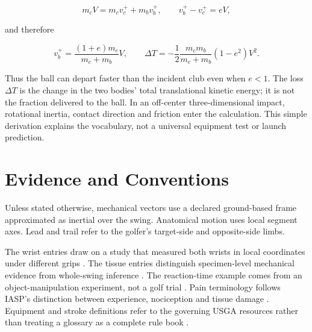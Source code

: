 \[
m_c V=m_c v_c^+ +m_b v_b^+,
\qquad v_b^+-v_c^+=eV,
\]

and therefore

\[
v_b^+=\frac{(1+e)m_c}{m_c+m_b}V,
\qquad
\Delta T=-\frac12\frac{m_cm_b}{m_c+m_b}(1-e^2)V^2.
\]

Thus the ball can depart faster than the incident club even when $e<1$. The loss $\Delta T$ is the change in the two bodies' total translational kinetic energy; it is not the fraction delivered to the ball. In an off-center three-dimensional impact, rotational inertia, contact direction and friction enter the calculation. This simple derivation explains the vocabulary, not a universal equipment test or launch prediction.

\section*{Evidence and Conventions}

Unless stated otherwise, mechanical vectors use a declared ground-based frame approximated as inertial over the swing. Anatomical motion uses local segment axes. Lead and trail refer to the golfer's target-side and opposite-side limbs.

The wrist entries draw on a study that measured both wrists in local coordinates under different grips \citep{glossaryWrist2019}. The tissue entries distinguish specimen-level mechanical evidence from whole-swing inference \citep{glossaryFascia2023}. The reaction-time example comes from an object-manipulation experiment, not a golf trial \citep{glossaryFeedback2016}. Pain terminology follows IASP's distinction between experience, nociception and tissue damage \citep{glossaryIASP}. Equipment and stroke definitions refer to the governing USGA resources rather than treating a glossary as a complete rule book \citep{glossaryUSGAEquipment,glossaryUSGAStroke}.


